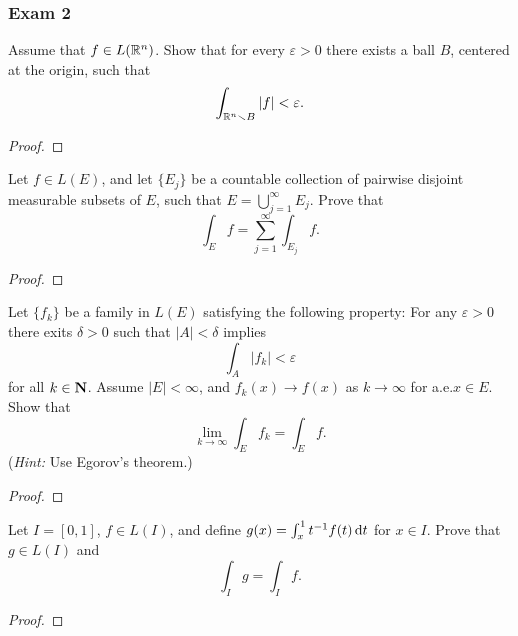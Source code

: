 \subsubsection{Exam 2}
\begin{problem}
Assume that $f\in L(\mathbb{R}^n)$. Show that for every $\varepsilon>0$ there
exists a ball $B$, centered at the origin, such that
\[
\int_{\mathbb{R}^n\smallsetminus B}|f|<\varepsilon.
\]
\end{problem}
\begin{proof}
\end{proof}

\begin{problem}
Let $f\in L(E)$, and let $\{E_j\}$ be a countable collection of pairwise
disjoint measurable subsets of $E$, such that $E=\bigcup_{j=1}^\infty
E_j$. Prove that
\[
\int_E f=\sum_{j=1}^\infty\int_{E_j}f.
\]
\end{problem}
\begin{proof}
\end{proof}

\begin{problem}
Let $\{f_k\}$ be a family in $L(E)$ satisfying the following property:
For any $\varepsilon>0$ there exits $\delta>0$ such that $|A|<\delta$
implies
\[
\int_A |f_k|<\varepsilon
\]
for all $k\in\mathbf{N}$. Assume $|E|<\infty$, and $f_k(x)\to f(x)$ as
$k\to\infty$ for a.e.\@ $x\in E$. Show that
\[
\lim_{k\to\infty}\int_E f_k=\int_E f.
\]
(\emph{Hint:} Use Egorov's theorem.)
\end{problem}
\begin{proof}
\end{proof}

\begin{problem}
Let $I=[0,1]$, $f\in L(I)$, and define $g(x)=\int_x^1
t^{-1}f(t) \mathop{}\!\mathrm{d} t$ for $x\in I$. Prove that $g\in L(I)$ and
\[
\int_I g=\int_I f.
\]
\end{problem}
\begin{proof}
\end{proof}

